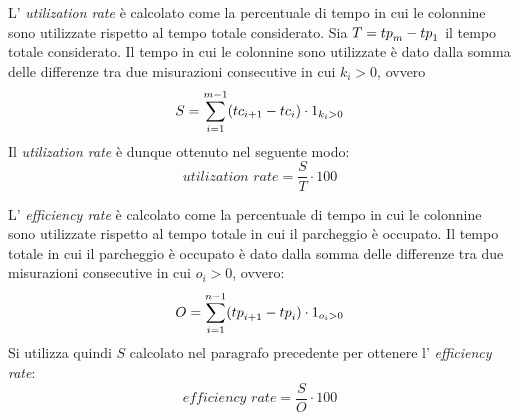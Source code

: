 L' \textit{utilization rate} è calcolato come la percentuale di tempo in cui le colonnine sono utilizzate rispetto al tempo totale considerato.
Sia $T = {tp}_m - {tp}_1$ il tempo totale considerato. Il tempo in cui le colonnine sono utilizzate è dato dalla somma delle differenze tra due misurazioni consecutive
in cui $k_i > 0$, ovvero
\[
	S = \sum_{i=1}^{m-1} ({tc}_{i+1} - {tc}_i) \cdot 1_{k_i > 0}
\]
Il \textit{utilization rate} è dunque ottenuto nel seguente modo:
\[
	\textit{utilization rate} = \frac{S}{T} \cdot 100
\]

L' \textit{efficiency rate} è calcolato come la percentuale di tempo in cui le colonnine sono utilizzate rispetto al tempo totale in cui il parcheggio è occupato.
Il tempo totale in cui il parcheggio è occupato è dato dalla somma delle differenze tra due misurazioni consecutive in cui $o_i > 0$, ovvero:
\[
	O = \sum_{i=1}^{n-1} ({tp}_{i+1} - {tp}_i) \cdot 1_{o_i > 0}
\]
Si utilizza quindi $S$ calcolato nel paragrafo precedente per ottenere l' \textit{efficiency rate}:
\[
	\textit{efficiency rate} = \frac{S}{O} \cdot 100
\]


